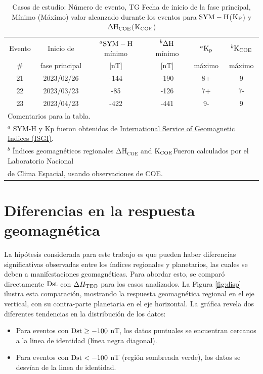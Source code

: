 \begin{table}[h!]
\normalsize
\centering
    \caption{Casos de estudio: Número de evento, TG Fecha de inicio de la fase principal, Mínimo (Máximo) valor alcanzado durante los eventos para ${\rm SYM-H}$(${\rm K_P}$) y ${\rm \Delta H_{COE}}$(${\rm K_{COE}}$)}
    \label{table2:GS_descp}
\begin{tabular}{cccccc}
\hline
Evento & Inicio de & $^a {\rm SYM-H}$ mínimo
 & $^b{\rm \Delta H}$ mínimo
 & $^a{\rm K_p}$ & $^b {\rm K_{COE}}$ \\
\#    & fase principal & [nT] & [nT] & máximo & máximo\\
\hline
21 & 2023/02/26 & -144 & -190 & 8+ & 9 \\ 
22 & 2023/03/23 & -85 & -126 & 7+ & 7- \\ 
23 & 2023/04/23 & -422 & -441 & 9- & 9 \\ 
\hline
\multicolumn{6}{l}{Comentarios para la tabla.} \\
\multicolumn{6}{l}{$^a$ SYM-H y Kp fueron obtenidos de \href{http://isgi.unistra.fr/data_download.php}{International Service of Geomagnetic Indices (ISGI)}.}\\
\multicolumn{6}{l}{$^b$ Índices geomagnéticos regionales $\mathrm{\Delta H_{COE}}$ and ${\rm K_{COE}}$Fueron calculados por el Laboratorio Nacional} \\
\multicolumn{6}{l}{de Clima Espacial, usando observaciones de COE.}    \end{tabular}
\end{table}

\section{Diferencias en la respuesta geomagnética} \label{respuesta_dif}

La hipótesis considerada para este trabajo es que pueden haber diferencias significativas observadas entre los índices regionales y planetarios, las cuales se deben a manifestaciones geomagnéticas. Para abordar esto, se comparó directamente ${\rm Dst}$ con $\Delta H_{\rm TEO}$ para los casos analizados. La Figura \ref{fig:disp} ilustra esta comparación, mostrando la respuesta geomagnética regional en el eje vertical, con su contra-parte planetaria en el eje horizontal. La gráfica revela dos diferentes tendencias en la distribución de los datos:

\begin{itemize}
    \item Para eventos con ${\rm Dst} \ge {\rm -100}$ nT, los datos puntuales se encuentran cercanos a la linea de identidad (línea negra diagonal).
    \item Para eventos con ${\rm Dst} < {\rm -100}$ nT (región sombreada verde), los datos se desvían de la linea de identidad.
\end{itemize}

